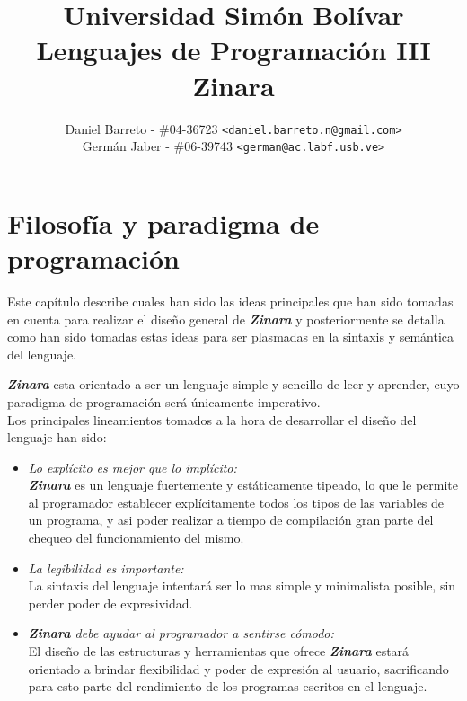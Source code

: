 \documentclass[12pt, spanish]{report}
\begin{document}
\title{Universidad Sim\'on Bol\'ivar \\ Lenguajes de Programaci\'on III \\ Zinara}
\author{
  Daniel Barreto - \#04-36723 \texttt{<daniel.barreto.n@gmail.com>} \\
  Germ\'an Jaber - \#06-39743 \texttt{<german@ac.labf.usb.ve>}
}
\maketitle

\tableofcontents

\newpage
\chapter{Filosof\'ia y paradigma de programaci\'on}
\label{chap:diseno}

Este cap\'itulo describe cuales han sido las ideas principales que han
sido tomadas en cuenta para realizar el dise\~no general de
\emph{\textbf{Zinara}} y posteriormente se detalla como han sido
tomadas estas ideas para ser plasmadas en la sintaxis y sem\'antica del
lenguaje.

\textbf{\emph{Zinara}} esta orientado a ser un lenguaje simple y
sencillo de leer y aprender, cuyo paradigma de programaci\'on ser\'a
\'unicamente imperativo.\\

Los principales lineamientos tomados a la hora de desarrollar el
dise\~no del lenguaje han sido:

\begin{itemize}
\item \emph{Lo expl\'icito es mejor que lo impl\'icito:}\\
  \emph{\textbf{Zinara}} es un lenguaje fuertemente y est\'aticamente
  tipeado, lo que le permite al programador establecer expl\'icitamente
  todos los tipos de las variables de un programa, y asi poder
  realizar a tiempo de compilaci\'on gran parte del chequeo del
  funcionamiento del mismo.

\item \emph{La legibilidad es importante:}\\
  La sintaxis del lenguaje intentar\'a ser lo mas simple y minimalista
  posible, sin perder poder de expresividad.

\item \emph{\textbf{Zinara} debe ayudar al programador a sentirse
    c\'omodo:}\\
  El dise\~no de las estructuras y herramientas que ofrece
  \emph{\textbf{Zinara}} estar\'a orientado a brindar flexibilidad y
  poder de expresi\'on al usuario, sacrificando para esto parte del
  rendimiento de los programas escritos en el lenguaje.
\end{itemize}
\end{document}
